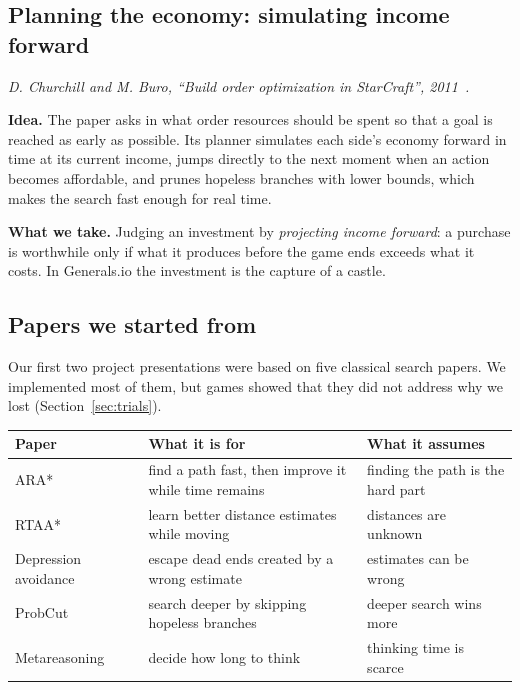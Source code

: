 \subsection{Planning the economy: simulating income forward}

\emph{D. Churchill and M. Buro, ``Build order optimization in StarCraft'', 2011~\cite{churchill}.}

\textbf{Idea.} The paper asks in what order resources should be spent so that a goal is reached as early as
possible. Its planner simulates each side's economy forward in time at its current income, jumps directly to
the next moment when an action becomes affordable, and prunes hopeless branches with lower bounds, which makes
the search fast enough for real time.

\textbf{What we take.} Judging an investment by \emph{projecting income forward}: a purchase is worthwhile
only if what it produces before the game ends exceeds what it costs. In Generals.io the investment is the
capture of a castle.

\subsection{Papers we started from}\label{sec:startpapers}

Our first two project presentations were based on five classical search papers. We implemented most of them,
but games showed that they did not address why we lost (Section~\ref{sec:trials}).

\begin{center}
\small
\begin{tabularx}{\linewidth}{>{\raggedright}p{3.4cm}XX}
\toprule
\textbf{Paper} & \textbf{What it is for} & \textbf{What it assumes}\\
\midrule
ARA*~\cite{ara} & find a path fast, then improve it while time remains & finding the path is the hard part\\
RTAA*~\cite{rtaa} & learn better distance estimates while moving & distances are unknown\\
Depression avoidance~\cite{depression} & escape dead ends created by a wrong estimate & estimates can be wrong\\
ProbCut~\cite{probcut} & search deeper by skipping hopeless branches & deeper search wins more\\
Metareasoning~\cite{meta} & decide how long to think & thinking time is scarce\\
\bottomrule
\end{tabularx}
\end{center}

